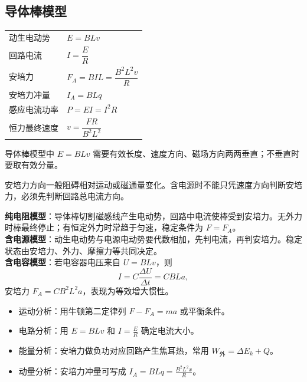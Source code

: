 
\subsection{导体棒模型}

\begin{tabularx}{\columnwidth}{XX}
  动生电动势&$E=BLv$\\
  回路电流&$I=\dfrac{E}{R}$\\
  安培力&$F_A=BIL=\dfrac{B^2L^2v}{R}$\\
  安培力冲量&$I_A=BLq$\\
  感应电流功率&$P=EI=I^2R$\\
  恒力最终速度&$v=\dfrac{FR}{B^2L^2}$\\
\end{tabularx}

\begin{formulanotebox}
导体棒模型中 $E=BLv$ 需要有效长度、速度方向、磁场方向两两垂直；不垂直时要取有效分量。

安培力方向一般阻碍相对运动或磁通量变化。含电源时不能只凭速度方向判断安培力，必须先判断回路总电流方向。
\end{formulanotebox}

\begin{keypointbox}[title={\strut\textcolor{white}{\bfseries 重点知识点：单棒模型}}]
\textbf{纯电阻模型}：导体棒切割磁感线产生电动势，回路中电流使棒受到安培力。无外力时棒最终停止；有恒定外力时常趋于匀速，稳定条件为 $F=F_A$。\\

\textbf{含电源模型}：动生电动势与电源电动势要代数相加，先判电流，再判安培力。稳定状态由安培力、外力、摩擦力等共同决定。\\

\textbf{含电容模型}：若电容器电压来自 $U=BLv$，则
\[
  I=C\frac{\Delta U}{\Delta t}=CBLa,
\]
安培力 $F_A=CB^2L^2a$，表现为等效增大惯性。
\end{keypointbox}

\begin{casetypebox}[title={\strut\textcolor{white}{\bfseries 常见题型：力、电、能联立}}]
\begin{itemize}[leftmargin=1.5em]
  \item 运动分析：用牛顿第二定律列 $F-F_A=ma$ 或平衡条件。
  \item 电路分析：用 $E=BLv$ 和 $I=\frac{E}{R}$ 确定电流大小。
  \item 能量分析：安培力做负功对应回路产生焦耳热，常用 $W_{\text{外}}=\Delta E_k+Q$。
  \item 动量分析：安培力冲量可写成 $I_A=BLq=\frac{B^2L^2x}{R}$。
\end{itemize}
\end{casetypebox}
